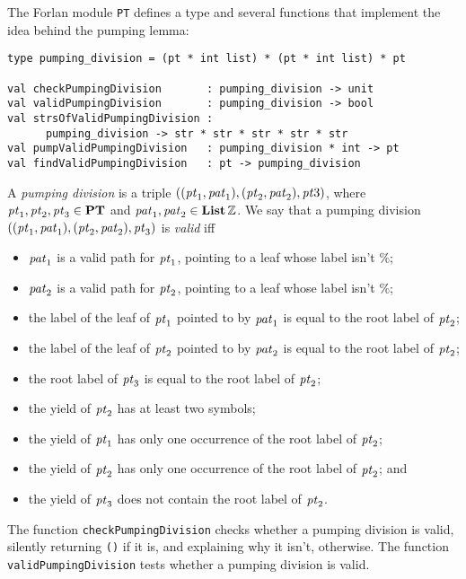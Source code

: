 The Forlan module \texttt{PT} defines a type and several functions
that implement the idea behind the pumping lemma:
\begin{verbatim}
type pumping_division = (pt * int list) * (pt * int list) * pt

val checkPumpingDivision       : pumping_division -> unit
val validPumpingDivision       : pumping_division -> bool
val strsOfValidPumpingDivision :
      pumping_division -> str * str * str * str * str
val pumpValidPumpingDivision   : pumping_division * int -> pt
val findValidPumpingDivision   : pt -> pumping_division
\end{verbatim}
%
%
%
%
%
%
A \emph{pumping division} is a triple $(({\it pt}_1, {\it pat}_1), ({\it pt}_2,
{\it pat}_2), {\it pt}3)$, where ${\it pt}_1, {\it pt}_2, {\it pt}_3\in\mathbf{PT}$ and ${\it pat}_1,
{\it pat}_2\in\mathbf{List}\,\mathbb{Z}$.  We say that a pumping division $(({\it pt}_1,
{\it pat}_1), ({\it pt}_2, {\it pat}_2), {\it pt}_3)$ is \emph{valid} iff
\begin{itemize}
\item ${\it pat}_1$ is a valid path for ${\it pt}_1$, pointing to a leaf whose
  label isn't $\%$;

\item ${\it pat}_2$ is a valid path for ${\it pt}_2$, pointing to a leaf whose
  label isn't $\%$;

\item the label of the leaf of ${\it pt}_1$ pointed to by ${\it pat}_1$ is equal
  to the root label of ${\it pt}_2$;

\item the label of the leaf of ${\it pt}_2$ pointed to by ${\it pat}_2$ is equal
  to the root label of ${\it pt}_2$;

\item the root label of ${\it pt}_3$ is equal to the root label of ${\it pt}_2$;

\item the yield of ${\it pt}_2$ has at least two symbols;

\item the yield of ${\it pt}_1$ has only one occurrence of the root label
  of ${\it pt}_2$;

\item the yield of ${\it pt}_2$ has only one occurrence of the root label
  of ${\it pt}_2$; and

\item the yield of ${\it pt}_3$ does not contain the root label of ${\it pt}_2$.
\end{itemize}
The function \texttt{checkPumpingDivision} checks whether a pumping division
is valid, silently returning \texttt{()} if it is, and explaining why
it isn't, otherwise.  The function \texttt{validPumpingDivision} tests
whether a pumping division is valid.


